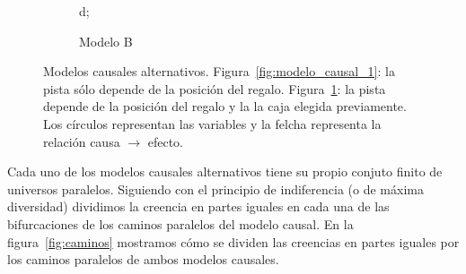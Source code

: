 \documentclass[a4paper,10pt]{book}
\theoremstyle{definition}
\begin{document}
\begin{figure}[ht!]
\begin{subfigure}[b]{0.48\textwidth}
{     {d};
  }
  \caption{Modelo B}
  \label{fig:modelo_causal_2}
  \end{subfigure}
  \caption{Modelos causales alternativos. Figura~\ref{fig:modelo_causal_1}: la pista sólo depende de la posición del regalo. Figura~\ref{fig:modelo_causal_2}: la pista depende de la posición del regalo y la la caja elegida previamente.
  Los círculos representan las variables y la felcha representa la relación causa $\rightarrow$ efecto. 
  }
  \label{fig:modelos_causales}
\end{figure}

% 


Cada uno de los modelos causales alternativos tiene su propio conjuto finito de universos paralelos.
%
Siguiendo con el principio de indiferencia (o de máxima diversidad) dividimos la creencia en partes iguales en cada una de las bifurcaciones de los caminos paralelos del modelo causal.
%
En la figura~\ref{fig:caminos} mostramos cómo se dividen las creencias en partes iguales por los caminos paralelos de ambos modelos causales.

\end{document}

